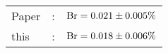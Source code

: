       \begin{tabular}{lcr}
          Paper &:& $\mathrm{Br}  = 0.021\pm 0.005\%$ \\
          this      &:& $\mathrm{Br}  = 0.018\pm 0.006\%$ \\        
      \end{tabular}
